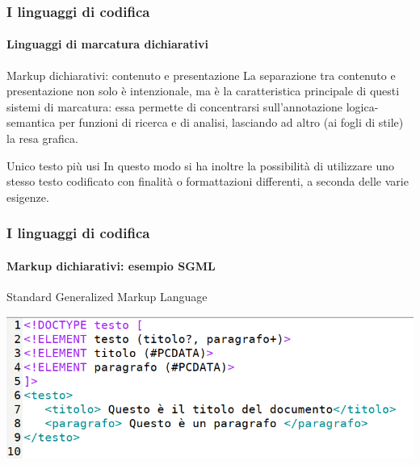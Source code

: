 \documentclass{beamer}
\begin{document}
\begin{frame}
	\frametitle{I linguaggi di codifica}
	\framesubtitle{Linguaggi di marcatura dichiarativi}
	\addtocounter{nframe}{1}

	\begin{block}{Markup dichiarativi: contenuto e presentazione}
		La separazione tra contenuto e presentazione non solo è intenzionale, ma è la caratteristica principale di questi sistemi di marcatura: essa permette di concentrarsi sull'annotazione logica-semantica per funzioni di ricerca e di analisi, lasciando ad altro (ai fogli di stile) la resa grafica.
	\end{block}

	\begin{block}{Unico testo più usi}
		In questo modo si ha inoltre la possibilità di utilizzare uno stesso testo codificato con
		finalità o formattazioni differenti, a seconda delle varie esigenze.
	\end{block}

\end{frame}

\begin{frame}
	\frametitle{I linguaggi di codifica}
	\framesubtitle{Markup dichiarativi: esempio SGML}
	\addtocounter{nframe}{1}

	\begin{block}{Standard Generalized Markup Language}
		\begin{center}
			\includegraphics[width=.9\textwidth]{imgs/xml-testo-sgml.png}
		\end{center}
	\end{block}

\end{frame}
\end{document}
